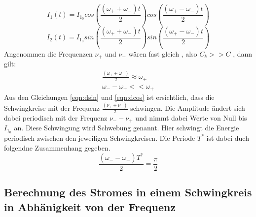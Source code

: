   \begin{equation}
    I_1 (t) = I_{1_0} cos \left( \frac{(\omega_+ + \omega_-)t}{2}\right) cos \left( \frac{(\omega_+ - \omega_-)t}{2}\right)
  \label{eqn:dcos}
  \end{equation}
  \begin{equation}
    I_2 (t) = I_{1_0} sin \left( \frac{(\omega_+ + \omega_-)t}{2}\right) sin \left( \frac{(\omega_+ - \omega_-)t}{2}\right)
  \label{eqn:dsin}
  \end{equation}
  Angenommen die Frequenzen $ \nu_+$ und $ \nu_-$ wären fast gleich , also $ C_k >> C $ , dann gilt:
  \begin{align}
    \frac{\left(\omega_+ + \omega_- \right)}{2} \approx \omega_+ \\
     \omega_- - \omega_+  << \omega_+
  \end{align}
  Aus den Gleichungen \eqref{eqn:dsin} und \eqref{eqn:dcos} ist ersichtlich, dass die Schwingkreise mit der Frequenz $\frac{(\nu_+ + \nu_-)}{2}$ schwingen. Die Amplitude ändert sich
  dabei periodisch mit der Frequenz $ \nu_- - \nu_+$ und nimmt dabei Werte von Null bis $ I_{1_0}$ an. Diese Schwingung wird Schwebung genannt. Hier schwingt die Energie periodisch zwischen
  den jeweiligen Schwingkreisen. Die Periode $T^*$ ist dabei duch folgendne Zusammenhang gegeben.
  \begin{equation}
      \frac{(\omega_- - \omega_+)T^*}{2} = \frac{\pi}{2}
  \end{equation}



  \subsection{Berechnung des Stromes in einem Schwingkreis in Abhänigkeit von der Frequenz}
